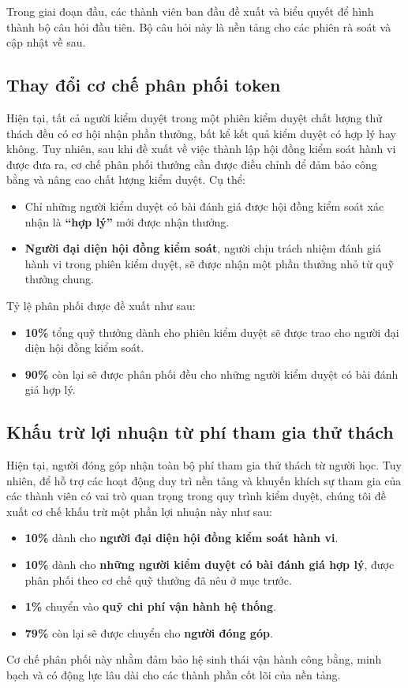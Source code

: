 Trong giai đoạn đầu, các thành viên ban đầu đề xuất và biểu quyết để hình thành bộ câu hỏi đầu tiên. Bộ câu hỏi này là nền tảng cho các phiên rà soát và cập nhật về sau.

\subsection{Thay đổi cơ chế phân phối token}

Hiện tại, tất cả người kiểm duyệt trong một phiên kiểm duyệt chất lượng thử thách đều có cơ hội nhận phần thưởng, bất kể kết quả kiểm duyệt có hợp lý hay không.
Tuy nhiên, sau khi đề xuất về việc thành lập hội đồng kiểm soát hành vi được đưa ra, cơ chế phân phối thưởng cần được điều chỉnh để đảm bảo công bằng và nâng cao chất lượng kiểm duyệt.
Cụ thể:
\begin{itemize}
  \item Chỉ những người kiểm duyệt có bài đánh giá được hội đồng kiểm soát xác nhận là \textbf{``hợp lý''} mới được nhận thưởng.
  \item \textbf{Người đại diện hội đồng kiểm soát}, người chịu trách nhiệm đánh giá hành vi trong phiên kiểm duyệt, sẽ được nhận một phần thưởng nhỏ từ quỹ thưởng chung.
\end{itemize}

Tỷ lệ phân phối được đề xuất như sau:
\begin{itemize}
  \item \textbf{10\%} tổng quỹ thưởng dành cho phiên kiểm duyệt sẽ được trao cho người đại diện hội đồng kiểm soát.
  \item \textbf{90\%} còn lại sẽ được phân phối đều cho những người kiểm duyệt có bài đánh giá hợp lý.
\end{itemize}

\subsection{Khấu trừ lợi nhuận từ phí tham gia thử thách}

Hiện tại, người đóng góp nhận toàn bộ phí tham gia thử thách từ người học. Tuy nhiên, để hỗ trợ các hoạt động duy trì nền tảng và khuyến khích sự tham gia của các thành viên có vai trò quan trọng trong quy trình kiểm duyệt, chúng tôi đề xuất cơ chế khấu trừ một phần lợi nhuận này như sau:
\begin{itemize}
  \item \textbf{10\%} dành cho \textbf{người đại diện hội đồng kiểm soát hành vi}.
  \item \textbf{10\%} dành cho \textbf{những người kiểm duyệt có bài đánh giá hợp lý}, được phân phối theo cơ chế quỹ thưởng đã nêu ở mục trước.
  \item \textbf{1\%} chuyển vào \textbf{quỹ chi phí vận hành hệ thống}.
  \item \textbf{79\%} còn lại sẽ được chuyển cho \textbf{người đóng góp}.
\end{itemize}
Cơ chế phân phối này nhằm đảm bảo hệ sinh thái vận hành công bằng, minh bạch và có động lực lâu dài cho các thành phần cốt lõi của nền tảng.


